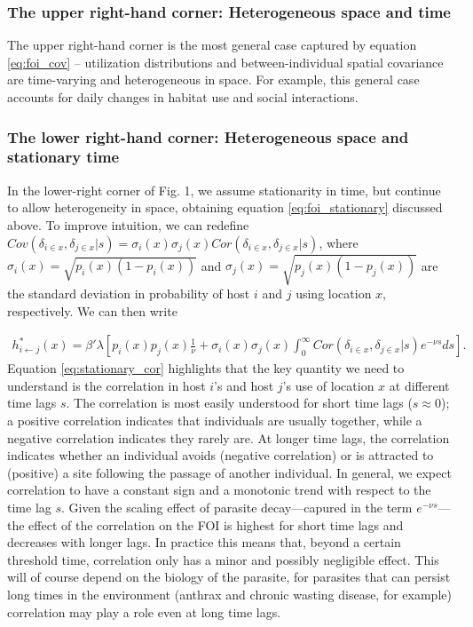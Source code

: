 \documentclass[letterpaper]{article}
\begin{document}
\subsubsection*{The upper right-hand corner: Heterogeneous space and time}

The upper right-hand corner is the most general case captured by equation \ref{eq:foi_cov} -- utilization distributions and between-individual spatial covariance are time-varying and heterogeneous in space.  For example, this general case accounts for daily changes in habitat use and social interactions. 

\subsubsection*{The lower right-hand corner: Heterogeneous space and stationary time}

In the lower-right corner of Fig. 1, we assume stationarity in time, but continue to allow heterogeneity in space, obtaining equation \ref{eq:foi_stationary} discussed above.  To improve intuition, we can redefine $Cov(\delta_{i \in x}, \delta_{j \in x} | s) = \sigma_i(x) \sigma_j(x) Cor(\delta_{i \in x}, \delta_{j \in x} | s)$, where $\sigma_i(x) = \sqrt{p_i(x)(1 - p_i(x))}$  and $\sigma_j(x) = \sqrt{p_j(x)(1 - p_j(x))}$ are the standard deviation in probability of host $i$ and $j$ using location $x$, respectively.  We can then write

\begin{equation}
    \begin{aligned}
    h^*_{i \leftarrow j}(x) = \beta' \lambda \left[ p_i(x)p_j(x) \frac{1}{\nu} + \sigma_i(x) \sigma_j(x) \int_{0}^{\infty} Cor(\delta_{i \in x}, \delta_{j \in x} | s) e^{-\nu s} ds\right].
    \end{aligned}
    \label{eq:stationary_cor}
\end{equation}
Equation \ref{eq:stationary_cor} highlights that the key quantity we need to understand is the correlation in host $i$'s and host $j$'s use of location $x$ at different time lags $s$. The correlation is most easily understood for short time lags ($s\approx0$); a positive correlation indicates that individuals are usually together, while a negative correlation indicates they rarely are. At longer time lags, the correlation indicates whether an individual avoids (negative correlation) or is attracted to (positive) a site following the passage of another individual. In general, we expect correlation to have a constant sign and a monotonic trend with respect to the time lag $s$. %
Given the scaling effect of parasite decay---capured in the term $e^{-\nu s}$---the effect of the correlation on the FOI is highest for short time lags and decreases with longer lags. In practice this means that, beyond a certain threshold time, correlation  only has a minor and possibly negligible effect. This will of course depend on the biology of the parasite, for parasites that can persist long times in the environment (anthrax and chronic wasting disease, for example) correlation may play a role even at long time lags.
\end{document}
